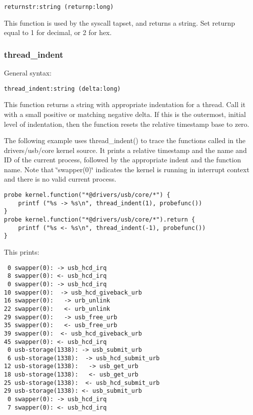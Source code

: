 \documentclass[twoside,english]{article}
\newenvironment{vindent}
{\begin{list}{}{\setlength{\listparindent}{6pt}}
\item[]}
{\end{list}}
\begin{document}
\begin{vindent}
\begin{verbatim}
returnstr:string (returnp:long)
\end{verbatim}
\end{vindent}
This function is used by the syscall tapset, and returns a string. Set \texttt{}returnp
equal to 1 for decimal, or 2 for hex.


\subsubsection{thread\_indent}
General syntax:

\begin{vindent}
\begin{verbatim}
thread_indent:string (delta:long)
\end{verbatim}
\end{vindent}
This function returns a string with appropriate indentation for a thread.
Call it with a small positive or matching negative delta. If this is the
outermost, initial level of indentation, then the function resets the relative
timestamp base to zero.

The following example uses thread\_indent() to trace the functions called
in the drivers/usb/core kernel source. It prints a relative timestamp and
the name and ID of the current process, followed by the appropriate indent
and the function name. Note that \char`\"{}swapper(0)\char`\"{} indicates
the kernel is running in interrupt context and there is no valid current
process.

\begin{vindent}
\begin{verbatim}
probe kernel.function("*@drivers/usb/core/*") {
    printf ("%s -> %s\n", thread_indent(1), probefunc())
}
probe kernel.function("*@drivers/usb/core/*").return {
    printf ("%s <- %s\n", thread_indent(-1), probefunc())
}
\end{verbatim}
\end{vindent}
This prints:

\begin{vindent}
\begin{verbatim}
 0 swapper(0): -> usb_hcd_irq
 8 swapper(0): <- usb_hcd_irq
 0 swapper(0): -> usb_hcd_irq
10 swapper(0):  -> usb_hcd_giveback_urb
16 swapper(0):   -> urb_unlink
22 swapper(0):   <- urb_unlink
29 swapper(0):   -> usb_free_urb
35 swapper(0):   <- usb_free_urb
39 swapper(0):  <- usb_hcd_giveback_urb
45 swapper(0): <- usb_hcd_irq
 0 usb-storage(1338): -> usb_submit_urb
 6 usb-storage(1338):  -> usb_hcd_submit_urb
12 usb-storage(1338):   -> usb_get_urb
18 usb-storage(1338):   <- usb_get_urb
25 usb-storage(1338):  <- usb_hcd_submit_urb
29 usb-storage(1338): <- usb_submit_urb
 0 swapper(0): -> usb_hcd_irq
 7 swapper(0): <- usb_hcd_irq
\end{verbatim}
\end{vindent}
\end{document}
